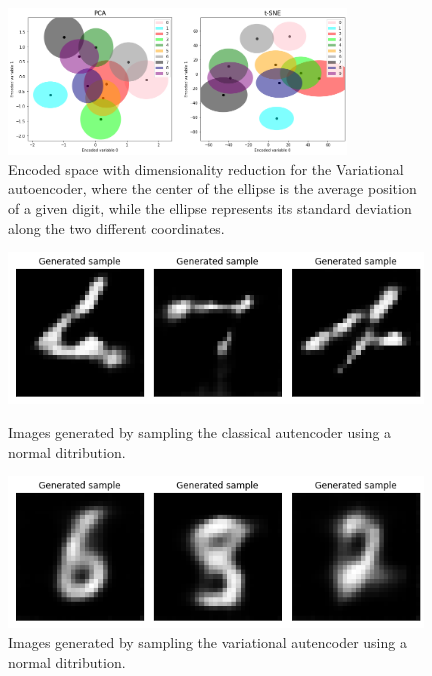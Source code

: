 \begin{figure}[h]
    \centering
    \includegraphics[width=0.8\textwidth]{Images/VAE.png}
    \caption{Encoded space with dimensionality reduction for the Variational autoencoder, where the center of the ellipse is the average position of a given digit, 
    while the ellipse represents its standard deviation along the two different coordinates.}
    \label{fig:dim_red_vae}
\end{figure}

\begin{figure}[h]
    \centering
    \begin{minipage}[t]{0.48\textwidth}
        \centering
        \includegraphics[width=0.98\textwidth]{Images/autoenc_generated.png}
        \caption{Images generated by sampling the classical autencoder using a normal ditribution.}
        \label{fig:gen_aut}
    \end{minipage}\hfill
    \begin{minipage}[t]{0.48\textwidth}
        \centering
        \includegraphics[width=0.98\textwidth]{Images/vae_generated.png}
        \caption{Images generated by sampling the variational autencoder using a normal ditribution.}
        \label{fig:gen_vae}
    \end{minipage}
\end{figure}
